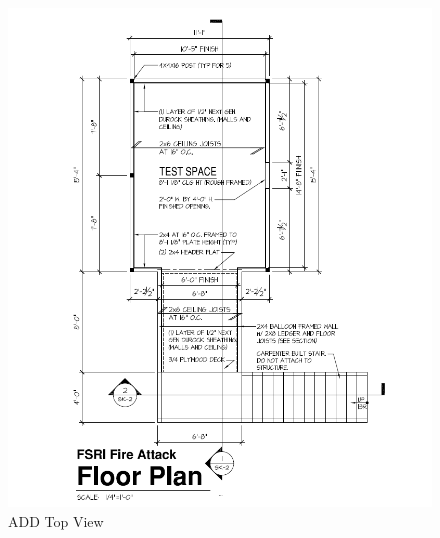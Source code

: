 \documentclass{article}
\begin{document}
\begin{figure}[!ht]
	\centering
	\includegraphics[width=5.5in]{Figures/Water_Distribution/ADDtopviewprint.png}
	\caption{ADD Top View}
	\label{fig:ADD_Top_View}
\end{figure}

\clearpage
\end{document}
